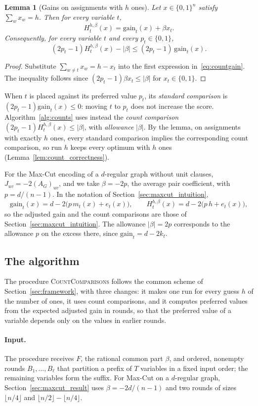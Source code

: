 \documentclass[11pt,a4paper]{article}
\newtheorem{lemma}[theorem]{Lemma}
\theoremstyle{definition}
\theoremstyle{remark}
\newcommand{\bits}{\{0,1\}}
\begin{document}
\begin{lemma}[Gains on assignments with $h$ ones]\label{lem:slice}
Let $x\in\bits^n$ satisfy $\sum_wx_w=h$. Then for every variable $t$,
\[
 H_t^{h,\beta}(x)=\mathrm{gain}_t(x)+\beta x_t.
\]
Consequently, for every variable $t$ and every $p_t\in\bits$,
\[
 (2p_t-1)H_t^{h,\beta}(x)-|\beta|\le(2p_t-1)\,\mathrm{gain}_t(x).
\]
\end{lemma}
\begin{proof}
Substitute $\sum_{w\ne t}x_w=h-x_t$ into the first expression
in~\eqref{eq:countgain}. The inequality follows since
$(2p_t-1)\beta x_t\le|\beta|$ for $x_t\in\bits$.
\end{proof}

When $t$ is placed against its preferred value $p_t$, its \emph{standard
comparison} is $(2p_t-1)\mathrm{gain}_t(x)\le0$: moving $t$ to $p_t$ does not
increase the score. Algorithm~\ref{alg:counts} uses instead the
\emph{count comparison} $(2p_t-1)H_t^{h,\beta}(x)\le|\beta|$, with
\emph{allowance} $|\beta|$. By the lemma, on assignments with exactly $h$
ones, every standard comparison implies the corresponding count
comparison, so run $h$ keeps every optimum with $h$ ones
(Lemma~\ref{lem:count_correctness}).

For the Max-Cut encoding of a $d$-regular graph without unit clauses,
$J_{uv}=-2(A_G)_{uv}$, and we take $\beta=-2p$, the average pair
coefficient, with $p=d/(n-1)$. In the notation of
Section~\ref{sec:maxcut_intuition},
\[
 \mathrm{gain}_t(x)=d-2\bigl(p\,m_t(x)+e_t(x)\bigr),\qquad
 H_t^{h,\beta}(x)=d-2\bigl(p\,h+e_t(x)\bigr),
\]
so the adjusted gain and the count comparisons are those of
Section~\ref{sec:maxcut_intuition}. The allowance $|\beta|=2p$ corresponds
to the allowance $p$ on the excess there, since
$\mathrm{gain}_t=d-2k_t$.

\subsection{The algorithm}

The procedure \textnormal{\textsc{CountComparisons}} follows the common scheme
of Section~\ref{sec:framework}, with three changes: it makes one run for
every guess $h$ of the number of ones, it uses count comparisons, and it
computes preferred values from the expected adjusted gain in rounds, so
that the preferred value of a variable depends only on the values in
earlier rounds.

\paragraph{Input.}
The procedure receives $F$, the rational common part $\beta$, and ordered,
nonempty rounds $B_1,\ldots,B_\ell$ that partition a prefix of $T$ variables
in a fixed input order; the remaining variables form the suffix. For Max-Cut
on a $d$-regular graph, Section~\ref{sec:maxcut_result} uses
$\beta=-2d/(n-1)$ and two rounds of sizes $\lfloor n/4\rfloor$ and
$\lfloor n/2\rfloor-\lfloor n/4\rfloor$.
\end{document}
